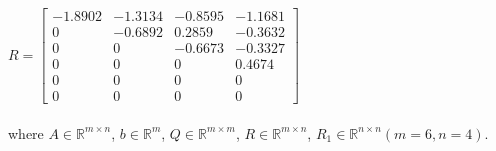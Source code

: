 \documentclass[12pt]{article}
\begin{document}
\\~\\$R=\left[\begin{array}{rrrr}{-1.8902} & {-1.3134} & {-0.8595} & {-1.1681} \\ {0} & {-0.6892} & {0.2859} & {-0.3632} \\ {0} & {0} & {-0.6673} & {-0.3327} \\ {0} & {0} & {0} & {0.4674} \\ {0} & {0} & {0} & {0} \\ {0} & {0} & {0} & {0}\end{array}\right]$
\\~\\where $A\in\mathbb{R}^{m\times n}$, $b\in\mathbb{R}^{m}$, $Q\in\mathbb{R}^{m\times m}$, $R\in\mathbb{R}^{m\times n}$, $R_1\in\mathbb{R}^{n\times n} (m=6, n=4)$.
\end{document}
